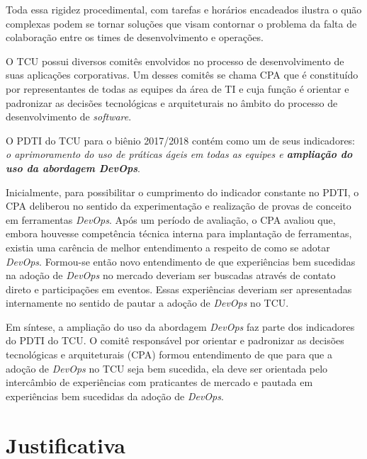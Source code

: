 Toda essa rigidez procedimental, com tarefas e horários encadeados ilustra o
quão complexas podem se tornar soluções que visam contornar o problema da falta
de colaboração entre os times de desenvolvimento e operações.

O \acrshort{TCU} possui diversos comitês envolvidos no processo de desenvolvimento
de suas aplicações corporativas. Um desses comitês se chama \acrfull{CPA} que é
constituído por representantes de todas as equipes da área de \acrshort{TI} e cuja
função é orientar e padronizar as decisões tecnológicas e arquiteturais no
âmbito do processo de desenvolvimento de \textit{software}.

O \acrfull{PDTI} do \acrshort{TCU} para o biênio 2017/2018 contém como um de seus
indicadores: \emph{o aprimoramento do uso de práticas ágeis em todas as equipes
e \textbf{ampliação do uso da abordagem DevOps}}.

Inicialmente, para possibilitar o cumprimento do indicador constante no
\acrshort{PDTI}, o \acrshort{CPA} deliberou no sentido da experimentação e
realização de provas de conceito em ferramentas \textit{DevOps}. Após um
período de avaliação, o \acrshort{CPA} avaliou que, embora
houvesse competência técnica interna para implantação de ferramentas, existia
uma carência de melhor entendimento a respeito de como se adotar \textit{DevOps}.
Formou-se então novo entendimento de que experiências bem sucedidas na adoção de
\textit{DevOps} no mercado deveriam ser buscadas através de contato direto
e participações em eventos. Essas experiências deveriam ser apresentadas
internamente no sentido de pautar a adoção de \textit{DevOps} no \acrshort{TCU}.

Em síntese, a ampliação do uso da abordagem \textit{DevOps} faz parte dos
indicadores do \acrshort{PDTI} do \acrshort{TCU}. O comitê responsável por
orientar e padronizar as decisões tecnológicas e arquiteturais (\acrshort{CPA})
formou entendimento de que para que a adoção de \textit{DevOps} no \acrshort{TCU}
seja bem sucedida, ela deve ser orientada pelo intercâmbio de experiências com
praticantes de mercado e pautada em experiências bem sucedidas da adoção de
\textit{DevOps}.

\section{Justificativa}%

